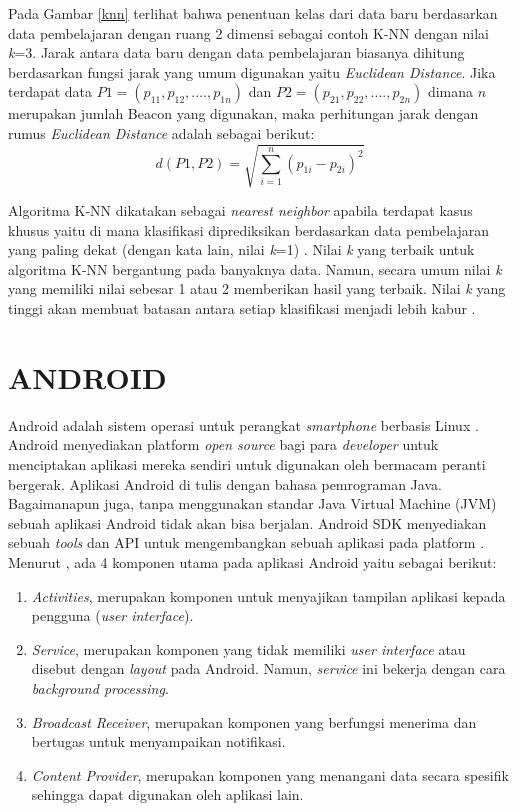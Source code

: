 \par Pada Gambar \ref{knn} terlihat bahwa penentuan kelas dari data baru berdasarkan data pembelajaran dengan ruang 2 dimensi sebagai contoh K-NN dengan nilai \textit{k}=3. Jarak antara data baru dengan data pembelajaran biasanya dihitung berdasarkan fungsi jarak yang umum digunakan yaitu \textit{Euclidean Distance}. Jika terdapat data $P1 = (p_{11}, p_{12},...., p_{1n})$ dan $P2 = (p_{21}, p_{22},...., p_{2n})$ dimana $n$ merupakan jumlah Beacon yang digunakan, maka perhitungan jarak dengan rumus \textit{Euclidean Distance} adalah sebagai berikut:
\begin{equation}
d(P1,P2)=\sqrt{\sum_{i=1}^{n}(p_{1i}-p_{2i})^2}
\end{equation}

\par Algoritma K-NN dikatakan sebagai \textit{nearest neighbor} apabila terdapat kasus khusus yaitu di mana klasifikasi diprediksikan berdasarkan data pembelajaran yang paling dekat (dengan kata lain, nilai \textit{k}=1) \citep{sutarti2016}. Nilai \textit{k} yang terbaik untuk algoritma K-NN bergantung pada banyaknya data. Namun, secara umum nilai \textit{k} yang memiliki nilai sebesar 1 atau 2 memberikan hasil yang terbaik. Nilai \textit{k} yang tinggi akan membuat batasan antara setiap klasifikasi menjadi lebih kabur \citep{otsason2005}.

\section{\uppercase{ANDROID}}
Android adalah sistem operasi untuk perangkat \textit{smartphone} berbasis Linux \citep{Safaat2011}. Android menyediakan platform \textit{open source} bagi para \textit{developer} untuk menciptakan aplikasi mereka sendiri untuk digunakan oleh bermacam peranti bergerak. Aplikasi Android di tulis dengan bahasa pemrograman Java. Bagaimanapun juga, tanpa menggunakan standar Java Virtual Machine (JVM) sebuah aplikasi Android tidak akan bisa berjalan. Android SDK menyediakan sebuah \textit{tools} dan API untuk mengembangkan sebuah aplikasi pada platform \citep{Golhar2016}. Menurut \cite{Supardi2011}, ada 4 komponen utama pada aplikasi Android yaitu sebagai berikut:
\begin{enumerate}[1.]
\itemsep0em
\item \emph{Activities}, merupakan komponen untuk menyajikan tampilan aplikasi kepada pengguna (\textit{user interface}).
\item \emph{Service}, merupakan komponen yang tidak memiliki \textit{user interface} atau disebut dengan \textit{layout} pada Android. Namun, \textit{service} ini bekerja dengan cara \textit{background processing}.
\item \emph{Broadcast Receiver}, merupakan komponen yang berfungsi menerima dan bertugas untuk menyampaikan notifikasi.
\item \emph{Content Provider}, merupakan komponen yang menangani data secara spesifik sehingga dapat digunakan oleh aplikasi lain.
\end{enumerate}

